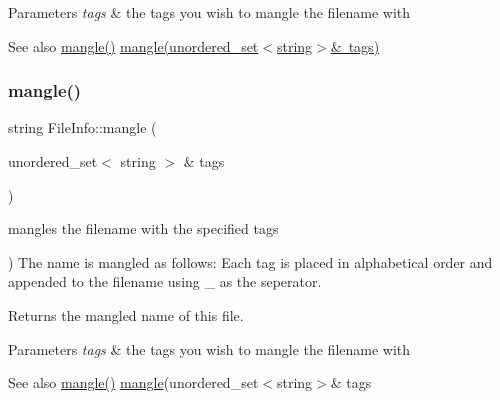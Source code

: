 \begin{DoxyParams}{Parameters}
{\em tags} & the tags you wish to mangle the filename with \\
\hline
\end{DoxyParams}
\begin{DoxySeeAlso}{See also}
\mbox{\hyperlink{class_file_info_a96827c2e48fb1a15d468e9afd545383e}{mangle()}} \mbox{\hyperlink{class_file_info_aec8a60addbed54097f6cac0a6a516717}{mangle(unordered\+\_\+set$<$string$>$\& tags)}} 
\end{DoxySeeAlso}
\mbox{\label{class_file_info_aec8a60addbed54097f6cac0a6a516717}} 
\subsubsection{\texorpdfstring{mangle()}{mangle()}\hspace{0.1cm}{\footnotesize\ttfamily [3/3]}}
{\footnotesize\ttfamily string File\+Info\+::mangle (\begin{DoxyParamCaption}\item[{unordered\+\_\+set$<$ string $>$ \&}]{tags }\end{DoxyParamCaption})}



mangles the filename with the specified tags 

) The name is mangled as follows\+: Each tag is placed in alphabetical order and appended to the filename using \textquotesingle{}\+\_\+\textquotesingle{} as the seperator.

\begin{DoxyReturn}{Returns}
the mangled name of this file. 
\end{DoxyReturn}

\begin{DoxyParams}{Parameters}
{\em tags} & the tags you wish to mangle the filename with \\
\hline
\end{DoxyParams}
\begin{DoxySeeAlso}{See also}
\mbox{\hyperlink{class_file_info_a96827c2e48fb1a15d468e9afd545383e}{mangle()}} \mbox{\hyperlink{class_file_info_a96827c2e48fb1a15d468e9afd545383e}{mangle}}(unordered\+\_\+set$<$string$>$\& tags 
\end{DoxySeeAlso}
\mbox{\label{class_file_info_a2bf60d4be97347f3d7a15cf839afca7d}} 
